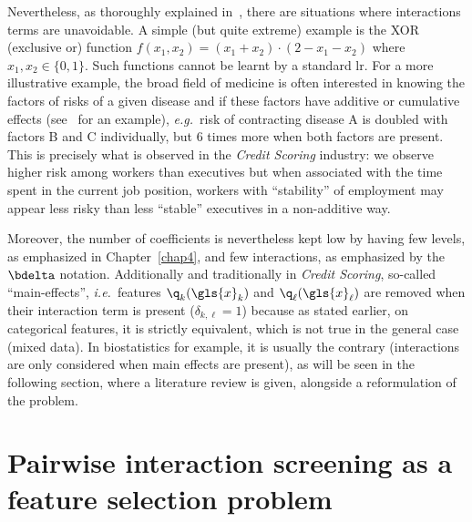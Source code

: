 Nevertheless, as thoroughly explained in~\cite{berry2010testing}, there are situations where interactions terms are unavoidable. A simple (but quite extreme) example is the XOR (exclusive or) function $f(x_1,x_2) = (x_1 + x_2)\cdot(2 - x_1 - x_2)$ where $x_1,x_2 \in \{0,1\}$. Such functions cannot be learnt by a standard \gls{lr}. For a more illustrative example, the broad field of medicine is often interested in knowing the factors of risks of a given disease and if these factors have additive or cumulative effects (see~\cite{morgan2014adversity} for an example), \textit{e.g.}\ risk of contracting disease A is doubled with factors B and C individually, but 6 times more when both factors are present. This is precisely what is observed in the \textit{Credit Scoring} industry: we observe higher risk among workers than executives but when associated with the time spent in the current job position, workers with ``stability'' of employment may appear less risky than less ``stable'' executives in a non-additive way.

Moreover, the number of coefficients is nevertheless kept low by having few levels, as emphasized in Chapter~\ref{chap4}, and few interactions, as emphasized by the $\bdelta$ notation. Additionally and traditionally in \textit{Credit Scoring}, so-called ``main-effects'', \textit{i.e.}\ features $\q_k(\gls{x}_k)$ and $\q_\ell(\gls{x}_\ell)$ are removed when their interaction term is present ($\delta_{k,\ell} = 1$) because as stated earlier, on categorical features, it is strictly equivalent, which is not true in the general case (mixed data). In biostatistics for example, it is usually the contrary (interactions are only considered when main effects are present), as will be seen in the following section, where a literature review is given, alongside a reformulation of the problem.


\section{Pairwise interaction screening as a feature selection problem} \label{sec:pairwise}

